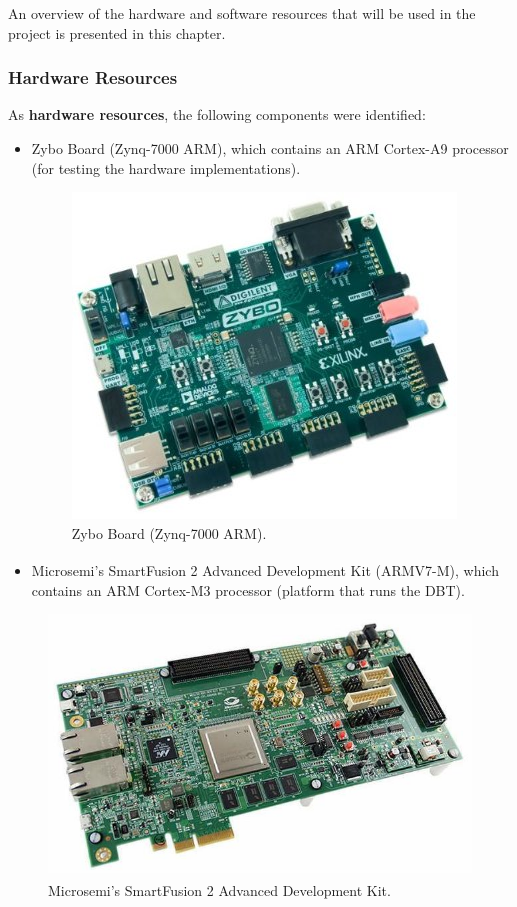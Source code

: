 
An overview of the hardware and software resources that will be used in the project  is presented in this chapter. 

\subsubsection{Hardware Resources}

As \textbf{hardware resources}, the following components were identified:
\begin{itemize}
\item Zybo Board (Zynq-7000 ARM), which contains an ARM Cortex-A9 processor (for testing the hardware implementations).

\begin{figure}[!htb]
\centering
\includegraphics[scale=0.3]{images/Zybo.jpg}
\caption{Zybo Board (Zynq-7000 ARM).}
\label{fig:Zybo} 
\end{figure}

\item Microsemi's SmartFusion\textsuperscript{\textregistered} 2 Advanced Development Kit (ARMV7-M), which contains an ARM Cortex-M3 processor (platform that runs the DBT).
\end{itemize}

\begin{figure}[!htb]
\centering
\includegraphics[scale=0.2]{images/SmartFusion2.jpg}
\caption{Microsemi's SmartFusion\textsuperscript{\textregistered} 2 Advanced Development Kit.}
\label{fig:SmartFusion} 
\end{figure}


